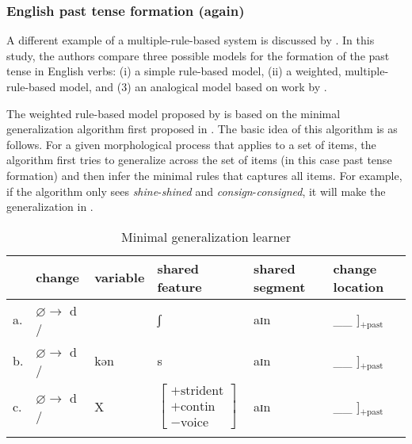 
\subsubsection{English past tense formation (again)}


A different example of a multiple-rule-based system is discussed by \textcite{Albright.2003}. In this study, the authors compare three possible models for the formation of the past tense in English verbs: (i) a simple rule-based model, (ii) a weighted, multiple-rule-based model, and (3) an analogical model based on work by \textcite{Nosofsky.1990}.

The weighted rule-based model proposed by \textcite{Albright.2003} is based on the minimal generalization algorithm first proposed in \textcite{Albright.1999}. The basic idea of this algorithm is as follows. For a given morphological process that applies to a set of items, the algorithm first tries to generalize across the set of items (in this case past tense formation) and then infer the minimal rules that captures all items. For example, if the algorithm only sees \textit{shine}-\textit{shined} and \textit{consign}-\textit{consigned}, it will make the generalization in .

 

\begin{table}
    \small
    \caption{Minimal generalization learner} \label{tab:minima-gen-al}
    \begin{tabular}[t]{llllll}
      \lsptoprule
      & change & variable & shared feature & shared segment & change location \\
      \midrule
      a. & $\varnothing{}\rightarrow$ d / & & ʃ & aɪn & \_\_ ]$_{+\text{past}}$ \\
      b. & $\varnothing{}\rightarrow$ d / & kən & s & aɪn & \_\_ ]$_{+\text{past}}$ \\
      c. & $\varnothing{}\rightarrow$ d / & X & $\left[\begin{array}{c}
                                               +\text{strident}\\
                                               +\text{contin}\\
                                               -\text{voice}
                                             \end{array}\right]$ & aɪn & \_\_ ]$_{+\text{past}}$ \\
      \lspbottomrule
    \end{tabular}
\end{table}

